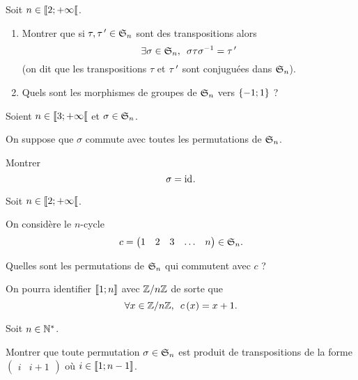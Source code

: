 \begin{corr}
\end{corr}

\begin{exo}[Exercice 3]
Soit \(n\in\interventierie{2}{\pinf}\).

\begin{enumerate}
\item Montrer que si \(\tau,\tau\prim\in\S{n}\) sont des transpositions alors \[\quantifs{\exists\sigma\in\S{n}}\sigma\tau\sigma\inv=\tau\prim\] (on dit que les transpositions \(\tau\) et \(\tau\prim\) sont conjuguées dans \(\S{n}\)). \\

\item Quels sont les morphismes de groupes de \(\S{n}\) vers \(\accol{-1;1}\) ?
\end{enumerate}
\end{exo}

\begin{corr}
\end{corr}

\begin{exo}[Exercice 4]
Soient \(n\in\interventierie{3}{\pinf}\) et \(\sigma\in\S{n}\).

On suppose que \(\sigma\) commute avec toutes les permutations de \(\S{n}\).

Montrer \[\sigma=\id{}.\]
\end{exo}

\begin{corr}
\end{corr}

\begin{exo}[Exercice 5]
Soit \(n\in\interventierie{2}{\pinf}\).

On considère le \(n\)-cycle \[c=\begin{pmatrix}1 & 2 & 3 & \dots & n\end{pmatrix}\in\S{n}.\]

Quelles sont les permutations de \(\S{n}\) qui commutent avec \(c\) ?

On pourra identifier \(\interventierii{1}{n}\) avec \(\Z/n\Z\) de sorte que \[\quantifs{\forall x\in\Z/n\Z}c\paren{x}=x+1.\]
\end{exo}

\begin{corr}
\end{corr}

\begin{exo}[Exercice 6]
Soit \(n\in\Ns\).

Montrer que toute permutation \(\sigma\in\S{n}\) est produit de transpositions de la forme \(\begin{pmatrix}i & i+1\end{pmatrix}\) où \(i\in\interventierii{1}{n-1}\).
\end{exo}

